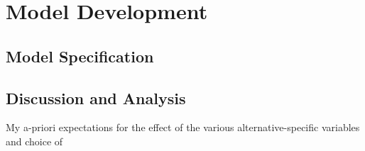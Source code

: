 \section{Model Development}
\subsection{Model Specification}
\subsection{Discussion and Analysis}
My a-priori expectations for the effect of the various alternative-specific variables and choice of 